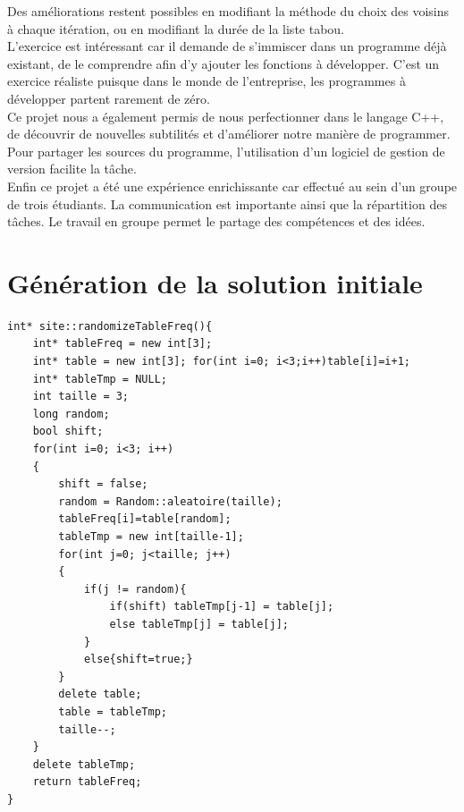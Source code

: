 \documentclass[a4paper, 11pt]{report}
\begin{document}
Des améliorations restent possibles en modifiant la méthode du choix des voisins à chaque itération, ou en modifiant la durée de la liste tabou.\\

L'exercice est intéressant car il demande de s'immiscer dans un programme déjà existant, de le comprendre afin d'y ajouter les fonctions à développer. C'est un exercice réaliste puisque dans le monde de l'entreprise, les programmes à développer partent rarement de zéro.\\

Ce projet nous a également permis de nous perfectionner dans le langage C++, de découvrir de nouvelles subtilités et d'améliorer notre manière de programmer. Pour partager les sources du programme, l'utilisation d'un logiciel de gestion de version facilite la tâche.\\

Enfin ce projet a été une expérience enrichissante car effectué au sein d'un groupe de trois étudiants. La communication est importante ainsi que la répartition des tâches. Le travail en groupe permet le partage des compétences et des idées. \\

\appendix
\chapter{Génération de la solution initiale}
\begin{lstlisting}
int* site::randomizeTableFreq(){
    int* tableFreq = new int[3];
    int* table = new int[3]; for(int i=0; i<3;i++)table[i]=i+1;
    int* tableTmp = NULL;
    int taille = 3;
    long random;
    bool shift;
    for(int i=0; i<3; i++)
    {
        shift = false;
        random = Random::aleatoire(taille);
        tableFreq[i]=table[random];
        tableTmp = new int[taille-1];
        for(int j=0; j<taille; j++)
        {
            if(j != random){
                if(shift) tableTmp[j-1] = table[j];
                else tableTmp[j] = table[j];
            }
            else{shift=true;}
        }
        delete table;
        table = tableTmp;
        taille--;
    }
    delete tableTmp;
    return tableFreq;
}
\end{lstlisting}
\end{document}
